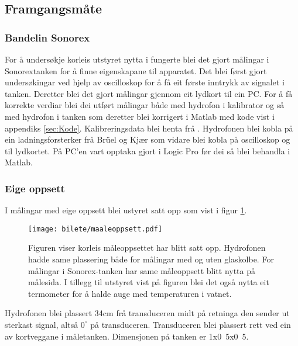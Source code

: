 \subsection{Framgangsmåte}
\subsubsection*{Bandelin Sonorex}
For å undersøkje korleis utstyret nytta i \cite{ultraprotese} fungerte blei det gjort målingar i Sonorextanken for å finne eigenskapane til apparatet. Det blei først gjort undersøkingar ved hjelp av oscilloskop for å få eit første inntrykk av signalet i tanken. Deretter blei det gjort målingar gjennom eit lydkort til ein PC. For å få korrekte verdiar blei dei utført målingar både med hydrofon i kalibrator og så med hydrofon i tanken som deretter blei korrigert i Matlab med kode vist i appendiks \ref{sec:Kode}. Kalibreringsdata blei henta frå \cite{calibrator}. Hydrofonen blei kobla på ein ladningsforsterker frå Brüel og Kjær som vidare blei kobla på oscilloskop og til lydkortet. På PC'en vart opptaka gjort i Logic Pro før dei så blei behandla i Matlab.

\subsubsection*{Eige oppsett}
I målingar med eige oppsett blei ustyret satt opp som vist i figur \ref{fig:maaleoppsett}.

\begin{figure}[htbp]
	\centering
  	\texttt{[image: bilete/maaleoppsett.pdf]}
  	\caption[Måleoppsett]{Figuren viser korleis måleoppsettet har blitt satt opp. Hydrofonen hadde same plassering både for målingar med og uten glaskolbe. For målingar i Sonorex-tanken har same måleoppsett blitt nytta på målesida. I tillegg til utstyret vist på figuren blei det også nytta eit termometer for å halde auge med temperaturen i vatnet.}
  	\label{fig:maaleoppsett}
\end{figure}

Hydrofonen blei plassert 34cm frå transduceren midt på retninga den sender ut sterkast signal, altså ${0}^\circ$ på transduceren. Transduceren blei plassert rett ved ein av kortveggane i måletanken. Dimensjonen på tanken er \unit{1x0.5x0.5}{\metre}.